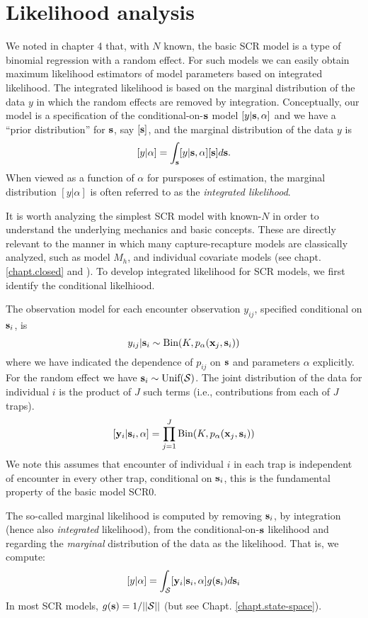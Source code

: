 \section{Likelihood analysis }

We noted in chapter 4 that, with $N$ known, the basic SCR model is a
type of binomial regression with a random effect. For such models we
can easily obtain maximum likelihood estimators of model parameters
based on integrated likelihood. The integrated likelihood is based on
the marginal distribution of the data $y$ in which the random effects
are removed by integration. Conceptually, our model is a specification
of the conditional-on-${\bf s}$ model $[y|{\bf s},\alpha]$ and we have
a ``prior distribution'' for ${\bf s}$, say $[{\bf s}]$, and the
marginal distribution of the data $y$ is
\[
[y|\alpha] =  \int_{\bf s} [y|{\bf s},\alpha][{\bf s}] d{\bf s}.
\]
When viewed as a function of $\alpha$ for pursposes of estimation, the
marginal distribution $[y|\alpha]$ is often referred to as the {\it
  integrated likelihood}.

It is worth analyzing 
the simplest SCR model with known-$N$ in order to understand the
underlying mechanics and basic concepts. These are directly relevant to
the manner in which many capture-recapture models are classically
analyzed, such as model $M_h$, and individual covariate models (see
chapt. \ref{chapt.closed} and  \citet[][chapt. 6]{royle_dorazio:2008}). To develop integrated
likelihood for SCR models, we first identify the conditional
likelhiood. 

The observation model for each encounter observation $y_{ij}$,
specified conditional on ${\bf s}_{i}$, is 
\begin{equation}
	y_{ij}| {\bf s}_{i} \sim \mbox{Bin}(K, p_{\alpha}({\bf x}_{j},{\bf s}_{i}))
\label{mle.eq.cond-on-s}
\end{equation}
where we have indicated the dependence of $p_{ij}$ on ${\bf s}$ and
parameters $\alpha$
explicitly.
For the random effect we have ${\bf s}_{i} \sim  \mbox{Unif}({\cal
  S})$.
The joint distribution of the data for individual $i$ is the product
of $J$ such terms (i.e., contributions from each of $J$ traps).
\[
  [{\bf y}_{i} | {\bf s}_{i} , \alpha] = 
  \prod_{j=1}^{J} \mbox{Bin}(K, p_{\alpha}({\bf x}_{j},{\bf s}_{i}) )
\]
We note this assumes that encounter of individual $i$ in each
trap is independent of encounter in every other trap, conditional on
${\bf s}_{i}$, this is the fundamental property of the basic model SCR0.


 The so-called marginal likelihood is computed by removing
${\bf s}_{i}$, by integration (hence also {\it integrated} likelihood), from the conditional-on-${\bf s}$
likelihood and regarding the {\it marginal} distribution of the data
as 
the likelihood. That
is, we compute:
\[
  [y|\alpha] = 
\int_{{\cal S}}  [ {\bf y}_{i} |{\bf s}_{i}, \alpha] g({\bf s}_{i}) d{\bf s}_{i}
\]
In most SCR models, $g({\bf s}) = 1/||{\cal S}||$ (but see Chapt. \ref{chapt.state-space}).

